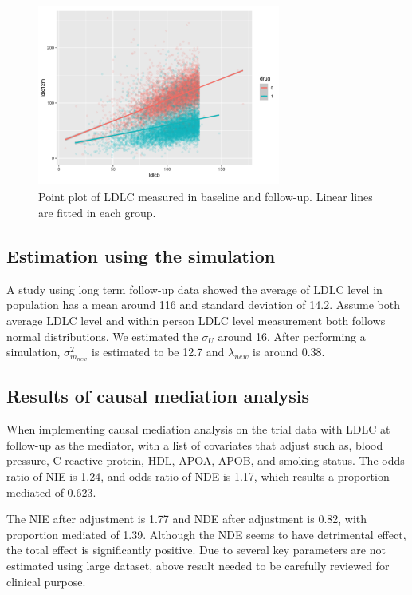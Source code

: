\documentclass{article}
\begin{document}
\begin{figure}[h]
\centering
\includegraphics[width = 8cm,height = 6cm]{figure-11.png}
\caption{Point plot of LDLC measured in baseline and follow-up. Linear lines are fitted in each group. }
\label{fig11}
\end{figure}


\subsection{Estimation using the simulation}

A study using long term follow-up data showed the average of LDLC level in population has a mean around 116 and standard deviation of 14.2. \cite{takahashi2010lipid} Assume both average LDLC level and within person LDLC level measurement both follows normal distributions. We estimated the $\sigma_U$ around 16. After performing a simulation,  $\sigma^2_{m_{new}}$ is estimated to be 12.7 and $\lambda_{new}$ is around 0.38. 

\subsection{Results of causal mediation analysis}

When implementing causal mediation analysis on the trial data with LDLC at follow-up as the mediator, with a list of covariates that adjust such as, blood pressure, C-reactive protein, HDL, APOA, APOB, and smoking status. The odds ratio of NIE is 1.24, and odds ratio of NDE is 1.17, which results a proportion mediated of 0.623.

The NIE after adjustment is 1.77 and NDE after adjustment is 0.82, with proportion mediated of 1.39.  Although the NDE seems to have detrimental effect, the total effect is significantly positive. Due to several key parameters are not estimated using large dataset, above result needed to be carefully reviewed for clinical purpose. 
\end{document}
